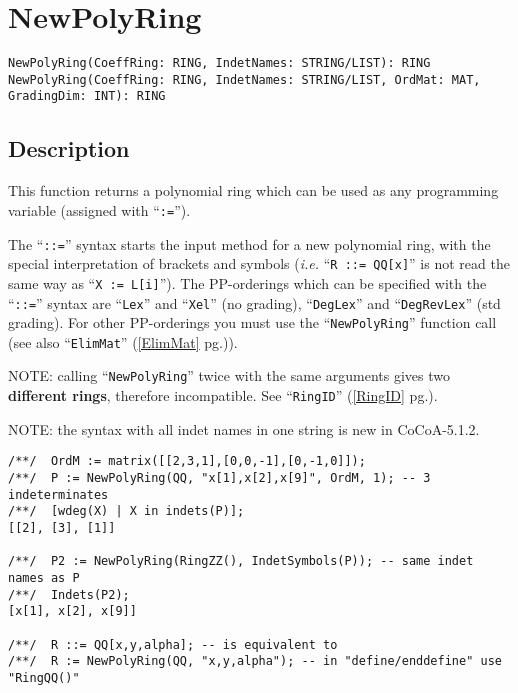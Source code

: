 \documentclass[a4paper]{mybook}
\newenvironment{command}{}{} %
\begin{document}
\section{NewPolyRing}
\label{NewPolyRing}
\begin{command} %


\begin{Verbatim}[label=syntax, rulecolor=\color{MidnightBlue},
frame=single]
NewPolyRing(CoeffRing: RING, IndetNames: STRING/LIST): RING
NewPolyRing(CoeffRing: RING, IndetNames: STRING/LIST, OrdMat: MAT, GradingDim: INT): RING
\end{Verbatim}


\subsection*{Description}

This function returns a polynomial ring which can be used as any
programming variable (assigned with ``\verb&:=&'').
\par 
The ``\verb&::=&'' syntax starts the input method for a new polynomial ring,
with the special interpretation of brackets and symbols
(\textit{i.e.} ``\verb&R ::= QQ[x]&'' is not read the same way as ``\verb&X := L[i]&'').
The PP-orderings which can be specified with the ``\verb&::=&'' syntax are
``\verb&Lex&'' and ``\verb&Xel&'' (no grading), ``\verb&DegLex&'' and ``\verb&DegRevLex&'' (std grading).
For other PP-orderings you must use the ``\verb&NewPolyRing&'' function call
(see also ``\verb&ElimMat&'' (\ref{ElimMat} pg.\pageref{ElimMat})).
\par 
NOTE: calling ``\verb&NewPolyRing&'' twice with the same arguments gives
two \textbf{different rings}, therefore incompatible.  See ``\verb&RingID&'' (\ref{RingID} pg.\pageref{RingID}).
\par 
NOTE: the syntax with all indet names in one string is new in CoCoA-5.1.2.
\begin{Verbatim}[label=example, rulecolor=\color{PineGreen}, frame=single]
/**/  OrdM := matrix([[2,3,1],[0,0,-1],[0,-1,0]]);
/**/  P := NewPolyRing(QQ, "x[1],x[2],x[9]", OrdM, 1); -- 3 indeterminates
/**/  [wdeg(X) | X in indets(P)];
[[2], [3], [1]]

/**/  P2 := NewPolyRing(RingZZ(), IndetSymbols(P)); -- same indet names as P
/**/  Indets(P2);
[x[1], x[2], x[9]]

/**/  R ::= QQ[x,y,alpha]; -- is equivalent to
/**/  R := NewPolyRing(QQ, "x,y,alpha"); -- in "define/enddefine" use "RingQQ()"


\end{Verbatim}
\end{command}
\end{document}
